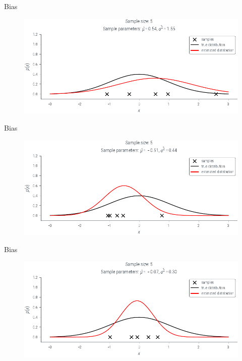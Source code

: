\documentclass[handout]{beamer}
\begin{document}
             \begin{frame}{Bias }
            \begin{figure}
                \includegraphics{../figures/mle/biased-mle-normal-5-1.pdf}
            \end{figure}
            
        \end{frame}

             \begin{frame}{Bias }
            \begin{figure}
                \includegraphics{../figures/mle/biased-mle-normal-5-2.pdf}
            \end{figure}
            
        \end{frame}

             \begin{frame}{Bias }
            \begin{figure}
                \includegraphics{../figures/mle/biased-mle-normal-5-3.pdf}
            \end{figure}
            
        \end{frame}
\end{document}
